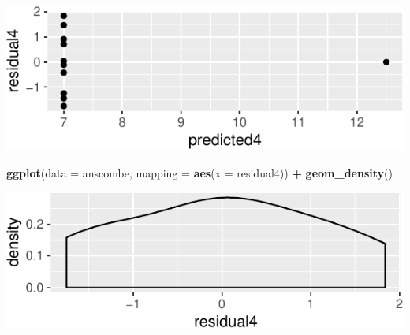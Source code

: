 \documentclass[14pt]{extarticle}
\newenvironment{Shaded}{\begin{snugshade}}{\end{snugshade}}
\newcommand{\KeywordTok}[1]{\textcolor[rgb]{0.13,0.29,0.53}{\textbf{#1}}}
\newcommand{\DataTypeTok}[1]{\textcolor[rgb]{0.13,0.29,0.53}{#1}}
\newcommand{\StringTok}[1]{\textcolor[rgb]{0.31,0.60,0.02}{#1}}
\newcommand{\OperatorTok}[1]{\textcolor[rgb]{0.81,0.36,0.00}{\textbf{#1}}}
\newcommand{\NormalTok}[1]{#1}
\begin{document}
\begin{Shaded}
\end{Shaded}

\includegraphics{20181112_anscombe_residuals_files/figure-latex/unnamed-chunk-13-1.pdf}

\begin{Shaded}
\begin{Highlighting}[]
\KeywordTok{ggplot}\NormalTok{(}\DataTypeTok{data =}\NormalTok{ anscombe, }\DataTypeTok{mapping =} \KeywordTok{aes}\NormalTok{(}\DataTypeTok{x =}\NormalTok{ residual4)) }\OperatorTok{+}
\StringTok{  }\KeywordTok{geom_density}\NormalTok{()}
\end{Highlighting}
\end{Shaded}

\includegraphics{20181112_anscombe_residuals_files/figure-latex/unnamed-chunk-14-1.pdf}
\end{document}

